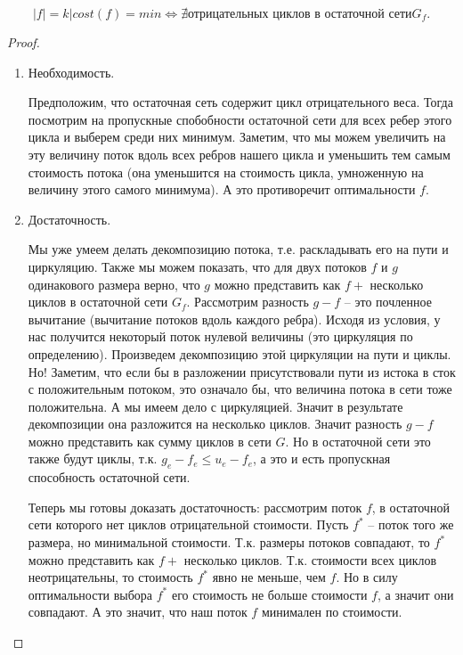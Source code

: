 \begin{lemma}
	\[ 
		|f| = k | cost(f) = min \Leftrightarrow \nexists \text{отрицательных циклов в остаточной сети} G_f.	
	\]
\end{lemma}
\begin{proof}
	\begin{enumerate}
		\item Необходимость. 
		
		Предположим, что остаточная сеть содержит цикл отрицательного веса. Тогда посмотрим на пропускные спобобности остаточной сети для всех ребер этого цикла и выберем среди них минимум. 
		Заметим, что мы можем увеличить на эту величину поток вдоль всех ребров нашего цикла и уменьшить тем самым стоимость потока (она уменьшится на стоимость цикла, умноженную на величину этого самого минимума).
		А это противоречит оптимальности $f$.

		\item Достаточность. 
		
		Мы уже умеем делать декомпозицию потока, т.е. раскладывать его на пути и циркуляцию. Также мы можем показать, что для двух потоков $f$ и $g$ одинакового размера верно, что $g$ можно 
		представить как $f +$ несколько циклов в остаточной сети $G_f$. Рассмотрим разность $g - f$ -- это почленное вычитание (вычитание потоков вдоль каждого ребра). Исходя из условия, у нас получится некоторый
		поток нулевой величины (это циркуляция по определению). Произведем декомпозицию этой циркуляции на пути и циклы. Но! Заметим, что если бы в разложении присутствовали пути из истока в сток с положительным 
		потоком, это означало бы, что величина потока в сети тоже положительна. А мы имеем дело с циркуляцией. Значит в результате декомпозиции она разложится на несколько циклов. Значит разность $g - f$ можно
		представить как сумму циклов в сети $G$. Но в остаточной сети это также будут циклы, т.к. $g_e - f_e \le u_e - f_e$, а это и есть пропускная способность остаточной сети.

		Теперь мы готовы доказать достаточность: рассмотрим поток $f$, в остаточной сети которого нет циклов отрицательной стоимости. Пусть $f^*$ -- поток того же размера, но минимальной стоимости. Т.к.
		размеры потоков совпадают, то $f^*$ можно представить как $f +$ несколько циклов. Т.к. стоимости всех циклов неотрицательны, то стоимость $f^*$ явно не меньше, чем $f$. Но в силу оптимальности выбора $f^*$
		его стоимость не больше стоимости $f$, а значит они совпадают. А это значит, что наш поток $f$ минимален по стоимости. 
	\end{enumerate}
\end{proof}

